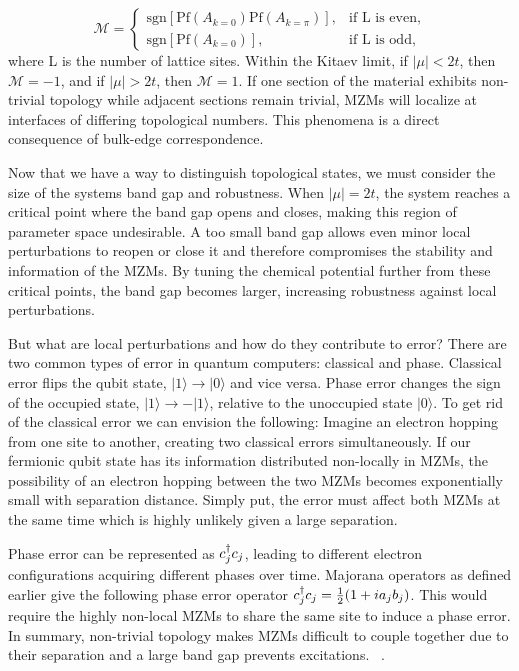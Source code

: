 \begin{equation}
  \mathcal{M} =
  \begin{cases}
    \text{sgn} [\text{Pf} (A_{k=0}) \text{Pf} (A_{k=\pi})], &\text{if L is even}, \\
    \text{sgn} [\text{Pf} (A_{k=0})], &\text{if L is odd},
  \end{cases}
\end{equation}
where L is the number of lattice sites.
Within the Kitaev limit, if $|\mu|< 2t$, then $\mathcal{M} = -1$, and if $|\mu| > 2t$, then $\mathcal{M} = 1$.
If one section of the material exhibits non-trivial topology while adjacent sections remain trivial, MZMs will localize at interfaces of differing topological numbers.
This phenomena is a direct consequence of bulk-edge correspondence.

Now that we have a way to distinguish topological states, we must consider the size of the systems band gap and robustness.
When $|\mu| = 2t$, the system reaches a critical point where the band gap opens and closes, making this region of parameter space undesirable.
A too small band gap allows even minor local perturbations to reopen or close it and therefore compromises the stability and information of the MZMs.
By tuning the chemical potential further from these critical points, the band gap becomes larger, increasing robustness against local perturbations.


But what are local perturbations and how do they contribute to error?
There are two common types of error in quantum computers: classical and phase.
Classical error flips the qubit state, $|1\rangle \rightarrow |0\rangle$ and vice versa.
Phase error changes the sign of the occupied state, $|1\rangle \rightarrow -|1\rangle$, relative to the unoccupied state $|0\rangle$. To get rid of the classical error we can envision the following: Imagine an electron hopping from one site to another, creating two classical errors simultaneously.
If our fermionic qubit state has its information distributed non-locally in MZMs, the possibility of an electron hopping between the two MZMs becomes exponentially small with separation distance.
Simply put, the error must affect both MZMs at the same time which is highly unlikely given a large separation.

Phase error can be represented as $c^{\dagger}_j c_j$, leading to different electron configurations acquiring different phases over time.
Majorana operators as defined earlier give the following phase error operator $c^{\dagger}_j c_j = \frac{1}{2} (1+ i a_j b_j)$.
This would require the highly non-local MZMs to share the same site to induce a phase error.
In summary, non-trivial topology makes MZMs difficult to couple together due to their separation and a large band gap prevents excitations.
~\cite{kitaevUnpairedMajoranaFermions2001}.



